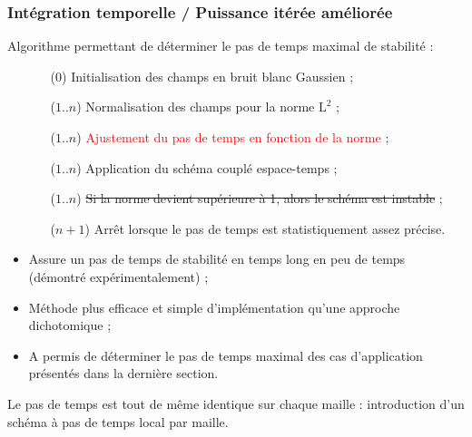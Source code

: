 \begin{frame}
\frametitle{Intégration temporelle / Puissance itérée améliorée}
\vfill
Algorithme permettant de déterminer le pas de temps maximal de stabilité :
\begin{itemize}
\item[] 
\begin{itemize}
\item [(0)] Initialisation des champs en bruit blanc Gaussien ;
\item [($1$..$n$)] Normalisation des champs pour la norme $\mathrm{L}^2$ ;
\item [($1$..$n$)] \textcolor{red}{Ajustement du pas de temps en fonction de la norme} ;
\item [($1$..$n$)] Application du schéma couplé espace-temps ;
\item [($1$..$n$)] \sout{Si la norme devient supérieure à 1, alors le schéma est instable} ;
\item [($n+1$)] Arrêt lorsque le pas de temps est statistiquement assez précise.
\end{itemize}
\end{itemize}
\vfill
\begin{itemize}
\item Assure un pas de temps de stabilité en temps long en peu de temps (démontré expérimentalement) ;
\item Méthode plus efficace et simple d'implémentation qu'une approche dichotomique ;
\item A permis de déterminer le pas de temps maximal des cas d'application présentés dans la dernière section.
\end{itemize}
\vfill
Le pas de temps est tout de même identique sur chaque maille : introduction d'un schéma à pas de temps local par maille.
\vfill
\end{frame}

